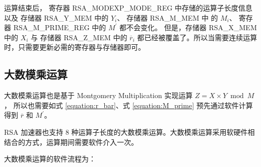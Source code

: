 \documentclass[main\_\_CN.tex]{subfiles}
\begin{document}
运算结束后，
寄存器 RSA\_MODEXP\_MODE\_REG 中存储的运算子长度信息以及
存储器 RSA\_Y\_MEM 中的 \begin{math}Y_{i}\end{math}、
存储器 RSA\_M\_MEM 中 的 \begin{math}M_{i}\end{math}、
寄存器 RSA\_M\_PRIME\_REG 中的 \begin{math}M^{\prime}\end{math} 都不会变化。
但是，存储器 RSA\_X\_MEM 中的 \begin{math}X_{i}\end{math} 与
存储器 RSA\_Z\_MEM 中的 \begin{math}\overline{r}_{i}\end{math} 
都已经被覆盖了。所以当需要连续运算时，只需要更新必需的寄存器与存储器即可。


\subsection{大数模乘运算}

大数模乘运算也是基于 Montgomery Multiplication 实现运算
\begin{math}Z = X \times Y \bmod M\end{math}，
所以也需要如式 \ref{equation:r_bar}、式 \ref{equation:M_prime}
预先通过软件计算得到 
\begin{math}\overline{r}\end{math} 和 
\begin{math}M^{\prime}\end{math}。

RSA 加速器也支持 8 种运算子长度的大数模乘运算。大数模乘运算采用软硬件相结合的方式，运算期间需要软件介入一次。

大数模乘运算的软件流程为：
\end{document}
